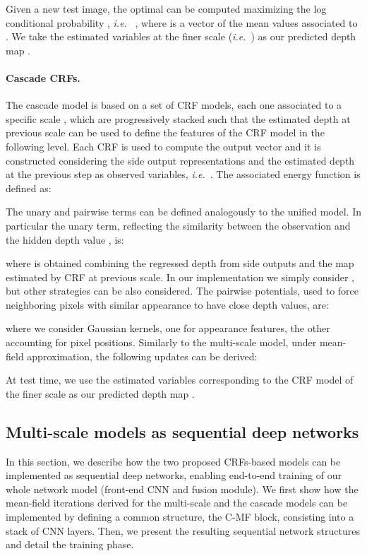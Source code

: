 \documentclass[10pt,twocolumn,letterpaper]{article}
\def\ie{\textit{i.e.}~}
\begin{document}
\setlength{\abovedisplayskip}{2pt}
\setlength{\belowdisplayskip}{2pt}

Given a new test image, the optimal  can be computed
maximizing the log conditional probability \cite{ristovski2013continuous}, \ie 
,
where  is a vector of the  mean values associated to .
We take the estimated variables at the finer scale  (\ie ) as our predicted depth map . 
\vspace{-3mm}

\paragraph{Cascade CRFs.}
The cascade model is based on a set of  CRF models, each one associated to a specific scale , which are
progressively stacked such that the estimated depth at previous scale can be used to define the features of the CRF model
in the following level.
Each CRF is used to compute the output vector  and it is 
constructed considering the side output representations  and the estimated depth at the previous
step  as observed variables, \ie .
The associated energy function is defined as:

The unary and pairwise terms can be defined analogously to the unified model.
In particular the unary term, reflecting the similarity between the observation  and the hidden depth value , is:

where  is obtained combining the regressed depth from side outputs  and 
the map  estimated by CRF at previous scale. In our implementation we simply consider , but other
strategies can be also considered.
The pairwise potentials, used to force neighboring pixels with similar appearance to have 
close depth values, are:

where we consider  Gaussian kernels, one for appearance features, the other accounting for pixel positions.
Similarly to the multi-scale model, under mean-field approximation, the following updates can be derived:


At test time, we use the estimated variables corresponding to the CRF model
of the finer scale  as our predicted depth map .

\subsection{Multi-scale models as sequential deep networks} \label{mean-field}
In this section, we describe how the two proposed CRFs-based models can be implemented
as sequential deep networks, enabling end-to-end training of our whole network model (front-end CNN and fusion module).
We first show how the mean-field iterations derived for the multi-scale and the cascade
models can be implemented by defining a common structure, the C-MF block, {consisting into a stack of CNN layers}. Then, we present the resulting sequential network structures and detail the training phase.
\vspace{-0.3cm}
\end{document}
